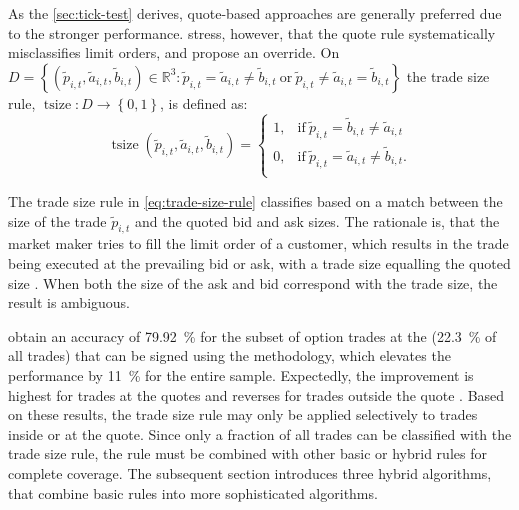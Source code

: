 As the \cref{sec:tick-test} derives, quote-based approaches are generally preferred due to the stronger performance. \textcite[][13]{grauerOptionTradeClassification2022} stress, however, that the quote rule systematically misclassifies limit orders, and propose an override. On $D = \left\{(\tilde{p}_{i, t} , \tilde{a}_{i, t} , \tilde{b}_{i,t}) \in \mathbb{R}^3: \tilde{p}_{i,t} = \tilde{a}_{i,t} \neq \tilde{b}_{i,t} \ \text{or} \ \tilde{p}_{i,t} \neq  \tilde{a}_{i,t} = \tilde{b}_{i,t} \right\}$ the trade size rule, $\operatorname{tsize} \colon D \to \left\{0,1\right\}$, is defined as:
\begin{equation}
  \operatorname{tsize}(\tilde{p}_{i, t} , \tilde{a}_{i, t} , \tilde{b}_{i,t})=
  \begin{cases}
    1, & \text{if}\ \tilde{p}_{i, t} = \tilde{b}_{i, t} \neq \tilde{a}_{i, t} \\
    0, & \text{if}\ \tilde{p}_{i, t} = \tilde{a}_{i, t} \neq \tilde{b}_{i, t}. \\
  \end{cases}
  \label{eq:trade-size-rule}
\end{equation}

The trade size rule in \cref{eq:trade-size-rule} classifies based on a match between the size of the trade $\tilde{p}_{i, t}$ and the quoted bid and ask sizes. The rationale is, that the market maker tries to fill the limit order of a customer, which results in the trade being executed at the prevailing bid or ask, with a trade size equalling the quoted size \autocite[][13]{grauerOptionTradeClassification2022}. When both the size of the ask and bid correspond with the trade size, the result is ambiguous.

\textcite[][13]{grauerOptionTradeClassification2022} obtain an accuracy of \SI{79.92}{\percent} for the subset of option trades at the   (\SI{22.3}{\percent} of all trades) that can be signed using the methodology, which elevates the performance by \SI{11}{\percent} for the entire sample. Expectedly, the improvement is highest for trades at the quotes and reverses for trades outside the quote \autocite[][15]{grauerOptionTradeClassification2022}. Based on these results, the trade size rule may only be applied selectively to trades inside or at the quote. Since only a fraction of all trades can be classified with the trade size rule, the rule must be combined with other basic or hybrid rules for complete coverage. The subsequent section introduces three hybrid algorithms, that combine basic rules into more sophisticated algorithms.

